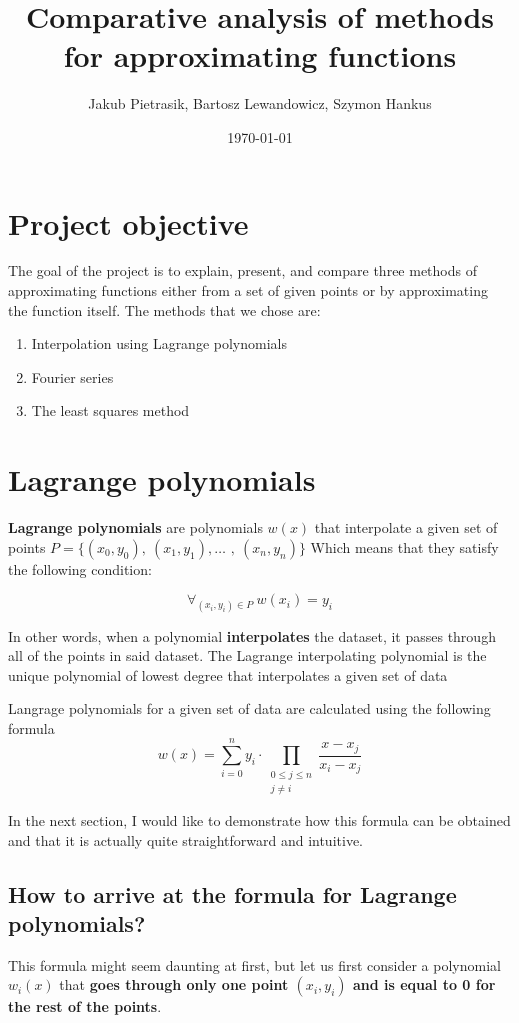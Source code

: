 \documentclass{MathematicaReport}
\date{\today}
\title{Comparative analysis of methods for approximating functions}
\author{Jakub Pietrasik, Bartosz Lewandowicz, Szymon Hankus}
\begin{document}
\maketitle

\section{Project objective}
The goal of the project is to explain, present, and compare three methods of
approximating functions either from a set of given points or by approximating
the function itself. The methods that we chose are:
\begin{enumerate}
	\item Interpolation using Lagrange polynomials
	\item Fourier series
	\item The least squares method
\end{enumerate}

\section{Lagrange polynomials}
\textbf{Lagrange polynomials} are polynomials \( w(x) \) that interpolate a 
given set of points
\( P = \{ (x_0, y_0)\)\(,\ (x_1, y_1)\)\(,\ldots\) \(,\ (x_n, y_n) \} \)
Which means that they satisfy the following condition:

\[
	\forall_{(x_i, y_i) \in P}\ w(x_i) = y_i
\]

In other words, when a polynomial \textbf{interpolates} the dataset, it passes 
through all of the points in said dataset.
The Lagrange interpolating polynomial is the unique polynomial of lowest degree 
that interpolates a given set of data

Langrage polynomials for a given set of data are calculated using the following
formula
\[
	w(x) = \sum_{i=0}^n y_i \cdot \prod_{\begin{smallmatrix}0\le j\le n\\ j\neq i\end{smallmatrix}}
	 \frac{x-x_j}{x_i-x_j}
\]

In the next section, I would like to demonstrate how this formula can be
obtained and that it is actually quite straightforward and intuitive.

\subsection{How to arrive at the formula for Lagrange polynomials?}
This formula might seem daunting at first, but let us first consider a
polynomial \( w_i(x) \) that \textbf{goes through only one point \( (x_i, y_i) \) 
and is equal to 0 for the rest of the points}.
\end{document}
